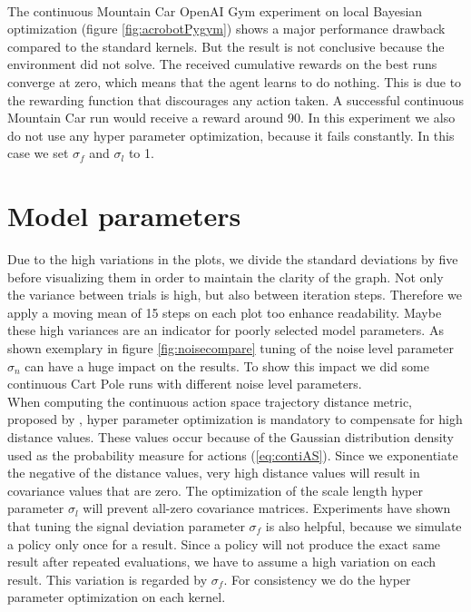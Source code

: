 \\
The continuous Mountain Car OpenAI Gym experiment on local Bayesian optimization (figure \ref{fig:acrobotPygym}) shows a major performance drawback compared to the standard kernels. But the result is not conclusive because the environment did not solve. The received cumulative rewards on the best runs converge at zero, which means that the agent learns to do nothing. This is due to the rewarding function that discourages any action taken. A successful continuous Mountain Car run would receive a reward around 90. In this experiment we also do not use any hyper parameter optimization, because it fails constantly. In this case we set $\sigma_f$ and $\sigma_l$ to 1.

\section{Model parameters}

Due to the high variations in the plots, we divide the standard deviations by five before visualizing them in order to maintain the clarity of the graph. Not only the variance between trials is high, but also between iteration steps. Therefore we apply a moving mean of 15 steps on each plot too enhance readability. Maybe these high variances are an indicator for poorly selected model parameters. As shown exemplary in figure \ref{fig:noisecompare} tuning of the noise level parameter $\sigma_n$ can have a huge impact on the results. To show this impact we did some continuous Cart Pole runs with different noise level parameters.
\\
When computing the continuous action space trajectory distance metric, proposed by \cite{wilson2014using}, hyper parameter optimization is mandatory to compensate for high distance values. These values occur because of the Gaussian distribution density used as the probability measure for actions (\ref{eq:contiAS}). Since we exponentiate the negative of the distance values, very high distance values will result in covariance values that are zero. The optimization of the scale length hyper parameter $\sigma_l$ will prevent all-zero covariance matrices. Experiments have shown that tuning the signal deviation parameter $\sigma_f$ is also helpful, because we simulate a policy only once for a result. Since a policy will not produce the exact same result after repeated evaluations, we have to assume a high variation on each result. This variation is regarded by $\sigma_f$. For consistency we do the hyper parameter optimization on each kernel.\\

